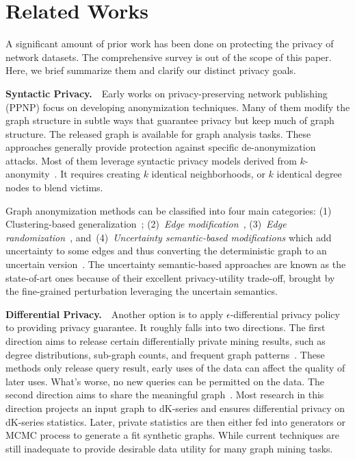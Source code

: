 \section{Related Works}
A significant amount of prior work has been done on protecting the privacy of network datasets.
The comprehensive survey is out of the scope of this paper. Here, we brief summarize them and clarify our distinct privacy goals. 

\textbf{Syntactic Privacy.}~~Early works on privacy-preserving network publishing (PPNP) focus on developing anonymization techniques. Many of them modify the graph structure in subtle ways that guarantee privacy but keep much of graph structure. The released graph is available for  graph analysis tasks. These approaches generally provide protection against specific de-anonymization attacks. Most of them leverage syntactic privacy models derived from $k$-anonymity~\cite{Sweeney:2002:KAM:774544.774552}. It requires creating $k$ identical neighborhoods, or $k$ identical degree nodes to blend victims. 

Graph anonymization methods can be classified into four main categories: (1) Clustering-based generalization~\cite{Hay_Anonymizing_2007,Bhagat_Class_2009,hay2010resisting}; (2)~{\em Edge modification}~\cite{Liu_Towards_2008, Zhou_Preserving_2008, Wang2011, Wu_k_2010, Skarkala_Privacy_2012}, 
(3)~{\em Edge randomization}~\cite{Liu_Privacy_2009,Ying_Randomizing_2008, Ninggal_Utility_2015},
and~(4)~{\em Uncertainty semantic-based modifications} which add uncertainty to some edges and thus converting the deterministic graph to an uncertain version~\cite{Boldi_Injecting_2012, Nguyen_Anonymizing_2015}. The uncertainty semantic-based approaches are known as the state-of-art ones because of their excellent privacy-utility trade-off, brought by the fine-grained perturbation leveraging the uncertain semantics. 

 
\textbf{Differential Privacy.}~~Another option is to apply {$\epsilon$}-differential privacy policy to providing privacy guarantee. It roughly falls into two directions. The first direction aims to release certain differentially private mining results, such as degree distributions, sub-graph counts, and frequent graph patterns~\cite{Xiao_Differentially_2014,Day:2016}. These methods only release query result, early uses of the data can affect the quality of later uses. What's worse, no new queries can be permitted on the data. The second direction aims to share the meaningful graph~\cite{Sala_Sharing_2011}. Most research in this direction projects an input graph to dK-series and ensures differential privacy on dK-series statistics. Later, private statistics are then either fed into generators or MCMC process to generate a fit synthetic graphs. While current techniques are still inadequate to provide desirable data utility for many graph mining tasks. 

